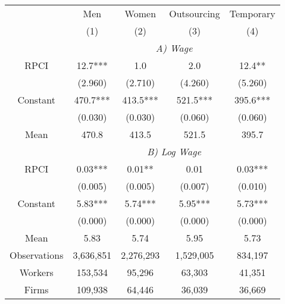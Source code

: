 \begin{tabular}{ccccc}
\toprule
\toprule
      & Men   & Women & Outsourcing & Temporary \\
      & (1)   & (2)   & (3)   & (4) \\
\cmidrule{2-5}      & \multicolumn{4}{c}{\textit{A) Wage}} \\
\midrule
RPCI  & 12.7*** & 1.0   & 2.0   & 12.4** \\
      & (2.960) & (2.710) & (4.260) & (5.260) \\
Constant & 470.7*** & 413.5*** & 521.5*** & 395.6*** \\
      & (0.030) & (0.030) & (0.060) & (0.060) \\
Mean  & 470.8 & 413.5 & 521.5 & 395.7 \\
\cmidrule{2-5}      & \multicolumn{4}{c}{\textit{B) Log Wage}} \\
\midrule
RPCI  & 0.03*** & 0.01** & 0.01  & 0.03*** \\
      & (0.005) & (0.005) & (0.007) & (0.010) \\
Constant & 5.83*** & 5.74*** & 5.95*** & 5.73*** \\
      & (0.000) & (0.000) & (0.000) & (0.000) \\
Mean  & 5.83  & 5.74  & 5.95  & 5.73 \\
\midrule
Observations & 3,636,851 & 2,276,293 & 1,529,005 & 834,197 \\
Workers & 153,534 & 95,296 & 63,303 & 41,351 \\
Firms & 109,938 & 64,446 & 36,039 & 36,669 \\
\bottomrule
\bottomrule
\end{tabular}%
